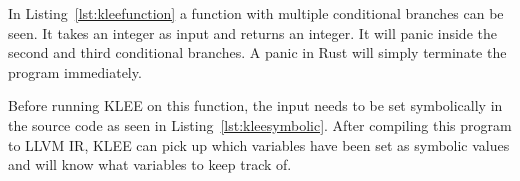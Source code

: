 In Listing~\ref{lst:kleefunction} a function with multiple conditional branches
can be seen. It takes an integer as input and returns an integer. It will
panic inside the second and third conditional branches. A panic in Rust will
simply terminate the program immediately.


Before running KLEE on this function, the input needs to be set symbolically in
the source code as seen in Listing~\ref{lst:kleesymbolic}. After compiling this
program to LLVM IR, KLEE can pick up which variables have been set as symbolic
values and will know what variables to keep track of.


